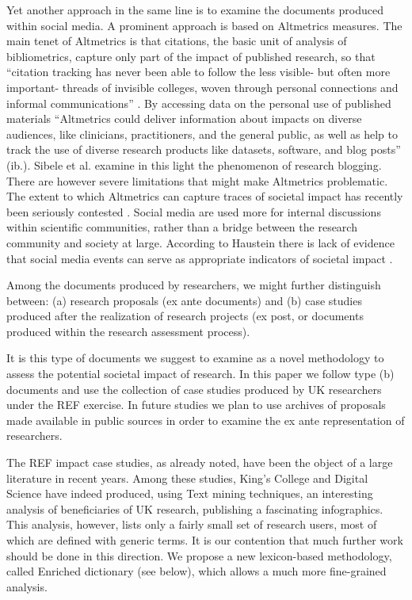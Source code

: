 \documentclass[]{book}
\begin{document}
Yet another approach in the same line is to examine the documents
produced within social media. A prominent approach is based on
Altmetrics measures. The main tenet of Altmetrics is that citations, the
basic unit of analysis of bibliometrics, capture only part of the impact
of published research, so that ``citation tracking has never been able
to follow the less visible- but often more important- threads of
invisible colleges, woven through personal connections and informal
communications'' \citep{priem2012altmetrics}. By accessing data on the
personal use of published materials ``Altmetrics could deliver
information about impacts on diverse audiences, like clinicians,
practitioners, and the general public, as well as help to track the use
of diverse research products like datasets, software, and blog posts''
(ib.). Sibele et al. \citep{fausto2012research} examine in this light
the phenomenon of research blogging. There are however severe
limitations that might make Altmetrics problematic. The extent to which
Altmetrics can capture traces of societal impact has recently been
seriously contested \citep{bornmann2014evaluate}. Social media are used
more for internal discussions within scientific communities, rather than
a bridge between the research community and society at large. According
to Haustein there is lack of evidence that social media events can serve
as appropriate indicators of societal impact \citep{haustein2016tweets}.

Among the documents produced by researchers, we might further
distinguish between: (a) research proposals (ex ante documents) and (b)
case studies produced after the realization of research projects (ex
post, or documents produced within the research assessment process).

It is this type of documents we suggest to examine as a novel
methodology to assess the potential societal impact of research. In this
paper we follow type (b) documents and use the collection of case
studies produced by UK researchers under the REF exercise. In future
studies we plan to use archives of proposals made available in public
sources in order to examine the ex ante representation of researchers.

The REF impact case studies, as already noted, have been the object of a
large literature in recent years. Among these studies, King's College
and Digital Science \citep{king2015nature} have indeed produced, using
Text mining techniques, an interesting analysis of beneficiaries of UK
research, publishing a fascinating infographics. This analysis, however,
lists only a fairly small set of research users, most of which are
defined with generic terms. It is our contention that much further work
should be done in this direction. We propose a new lexicon-based
methodology, called Enriched dictionary (see below), which allows a much
more fine-grained analysis.
\end{document}
